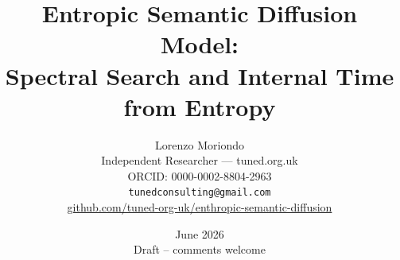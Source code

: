 \documentclass[11pt]{article}
\begin{document}

\title{%
  \textbf{Entropic Semantic Diffusion Model:\\Spectral Search and Internal Time from Entropy}%
}

\author{%
  Lorenzo Moriondo\\[2pt]
\small Independent Researcher --- tuned.org.uk\\
\small ORCID: 0000-0002-8804-2963\\
  \texttt{tunedconsulting@gmail.com} \\
  \href{https://github.com/tuned-org-uk/enthropic-semantic-diffusion}{%
    github.com/tuned-org-uk/enthropic-semantic-diffusion}}


\date{June 2026 \\ \small{Draft -- comments welcome}}

\maketitle
\end{document}
